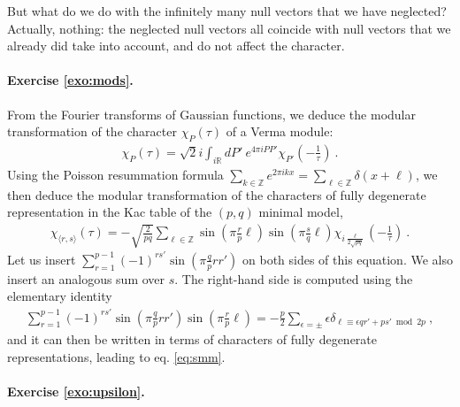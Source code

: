 \documentclass[12pt, a4paper]{article}
\theoremstyle{break}
\begin{document}
But what do we do with the infinitely many null vectors that we have neglected? Actually, nothing: the neglected null vectors all coincide with null vectors that we already did take into account, and do not affect the character.

\paragraph{Exercise \ref{exo:mods}.}

From the Fourier transforms of Gaussian functions, we deduce the modular transformation of the character $\chi_{P}(\tau)$ of a Verma module: 
 \begin{align}
  \chi_P(\tau) = \sqrt{2}i\int_{i\mathbb{R}} dP'\ e^{4\pi iPP'} \chi_{P'}(-\tfrac{1}{\tau})\ . 
 \end{align}
Using the Poisson resummation formula $\sum_{k\in\mathbb{Z}} e^{2\pi ikx} = \sum_{\ell\in\mathbb{Z}} \delta(x+\ell)$, we then deduce the modular transformation of the characters of fully degenerate representation in the Kac table of the $(p, q)$ minimal model,
\begin{align}
 \chi_{\langle r,s\rangle}(\tau) = 
 -\sqrt{\frac{2}{pq}}\sum_{\ell\in\mathbb{Z}} 
 \sin\left(\pi\frac{r}{p}\ell\right) 
 \sin\left(\pi\frac{s}{q}\ell\right)
 \chi_{i\frac{\ell}{2\sqrt{pq}}}(-\tfrac{1}{\tau})\ .
 \label{eq:chs}
\end{align}
Let us insert $\sum_{r=1}^{p-1} (-1)^{rs'}\sin\left(\pi\frac{q}{p}rr'\right)$ on both sides of this equation. We also insert an analogous sum over $s$. The right-hand side is computed using the elementary identity
\begin{align}
 \sum_{r=1}^{p-1} (-1)^{rs'}\sin\left(\pi\frac{q}{p}rr'\right)\sin\left(\pi\frac{r}{p}\ell\right) 
 = -\frac{p}{2}\sum_{\epsilon =\pm} \epsilon \delta_{\ell\equiv\epsilon qr'+ps'\bmod 2p}\ ,
\end{align}
and it can then be written in terms of characters of fully degenerate representations, leading to 
eq. \eqref{eq:smm}.

\paragraph{Exercise \ref{exo:upsilon}.}
\end{document}
